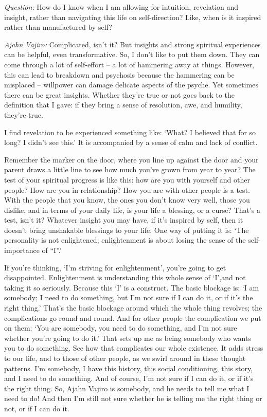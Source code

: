\bigskip

\emph{Question:} How do I know when I am allowing for intuition, revelation and insight,
rather than navigating this life on self-direction? Like, when is it inspired
rather than manufactured by self?

\emph{Ajahn Vajiro:} Complicated, isn't it? But insights and strong spiritual
experiences can be helpful, even transformative. So, I don't like to put them
down. They can come through a lot of self-effort -- a lot of hammering away at
things. However, this can lead to breakdown and psychosis because the hammering
can be misplaced -- willpower can damage delicate aspects of the psyche. Yet
sometimes there can be great insights. Whether they're true or not goes back to
the definition that I gave: if they bring a sense of resolution, awe, and
humility, they're true.

I find revelation to be experienced something like: `What? I believed that for so long? I didn't see this.' It is accompanied by a sense of calm and lack of conflict.

Remember the marker on the door, where you line up against the door and your
parent draws a little line to see how much you've grown from year to year? The
test of your spiritual progress is like this: how are you with yourself and
other people? How are you in relationship? How you are with other people is a
test. With the people that you know, the ones you don't know very well, those
you dislike, and in terms of your daily life, is your life a blessing, or a
curse? That's a test, isn't it? Whatever insight you may have, if it's
inspired by self, then it doesn't bring unshakable blessings to your life. One
way of putting it is: `The personality is not enlightened; enlightenment is
about losing the sense of the self-importance of ``I''.'

If you're thinking, `I'm striving for enlightenment', you're going to get
disappointed. Enlightenment is understanding this whole sense of `I',and not
taking it so seriously. Because this `I' is a construct. The basic blockage is:
`I am somebody; I need to do something, but I'm not sure if I can do it, or if
it's the right thing.' That's the basic blockage around which the whole thing
revolves; the complications go round and round. And for other people the complication we put on them: `You are somebody, you need
to do something, and I'm not sure whether you're going to do it.' That sets up
me as being somebody who wants you to do something. See how that complicates our
whole existence. It adds stress to our life, and to those of other people, as we
swirl around in these thought patterns. I'm somebody, I have this history, this social
conditioning, this story, and I need to do something. And of course, I'm not
sure if I can do it, or if it's the right thing. So, Ajahn Vajiro is somebody,
and he needs to tell me what I need to do! And then I'm still not sure whether he is telling me
the right thing or not, or if I can do it.

